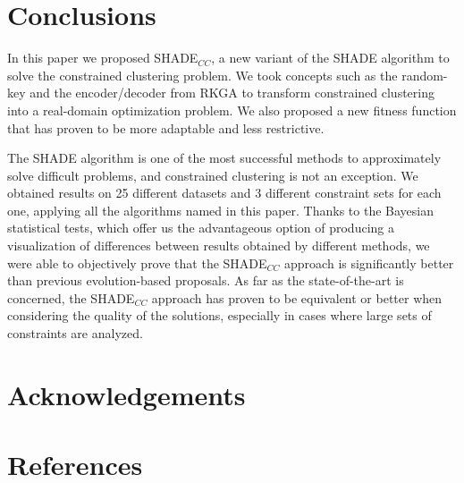 \documentclass[review]{elsarticle}
\begin{document}
\clearpage

\section{Conclusions} \label{sec:conclusiones}

In this paper we proposed SHADE$_{CC}$, a new variant of the SHADE algorithm to solve the constrained clustering problem. We took concepts such as the random-key and the encoder/decoder from RKGA to transform constrained clustering into a real-domain optimization problem. We also proposed a new fitness function that has proven to be more adaptable and less restrictive.

The SHADE algorithm is one of the most successful methods to approximately solve difficult problems, and constrained clustering is not an exception. We obtained results on 25 different datasets and 3 different constraint sets for each one, applying all the algorithms named in this paper. Thanks to the Bayesian statistical tests, which offer us the advantageous option of producing a visualization of differences between results obtained by different methods, we were able to objectively prove that the SHADE$_{CC}$ approach is significantly better than previous evolution-based proposals. As far as the state-of-the-art is concerned, the SHADE$_{CC}$ approach has proven to be equivalent or better when considering the quality of the solutions, especially in cases where large sets of constraints are analyzed.

\section{Acknowledgements}

\clearpage

\section*{References}


\end{document}
